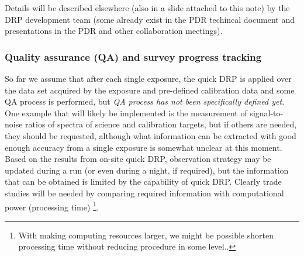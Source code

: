 \documentclass[a4paper,notitlepage]{article}
\begin{document}
Details will be described elsewhere (also in a slide attached to this note) 
by the DRP development team (some
already exist in the PDR techincal document and presentations in the PDR
and other collaboration meetings).


\subsubsection{Quality assurance (QA) and survey progress tracking}
\label{sec:qa}

So far we assume that after each single exposure, the quick DRP is
applied 
over the data set acquired by the exposure and pre-defined calibration data 
and some QA process is performed, but {\it QA process has not
been specifically defined yet.}  One example that will likely be
implemented is the measurement of signal-to-noise ratios of spectra of
science and calibration targets, but if others are needed, they should
be requested, although what information can be extracted with good
enough accuracy from a single exposure is somewhat unclear at this
moment. Based on the results from on-site quick DRP, observation
strategy may be updated during a run (or even during a night, if
required), but the information that can be obtained is limited by the
capability of quick DRP. Clearly trade studies will be needed by
comparing required information with computational power (processing
time) \footnote{With making computing resources larger, we might be
possible shorten processing time without reducing procedure in some
level..}.
\end{document}
